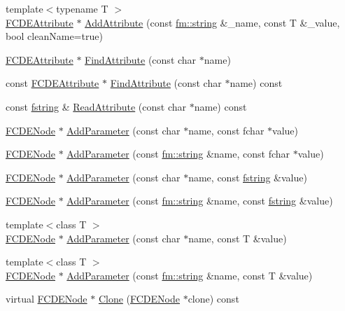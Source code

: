 \begin{DoxyCompactItemize}
\item 
{\footnotesize template$<$typename T $>$ }\\\hyperlink{classFCDEAttribute}{FCDEAttribute} $\ast$ \hyperlink{classFCDENode_acb91af32e7f1fac7f7de9819fee2fa1f}{AddAttribute} (const \hyperlink{classfm_1_1stringT}{fm::string} \&\_\-name, const T \&\_\-value, bool cleanName=true)
\item 
\hyperlink{classFCDEAttribute}{FCDEAttribute} $\ast$ \hyperlink{classFCDENode_a6e884f0a82646133db5cc931bca2b4f3}{FindAttribute} (const char $\ast$name)
\item 
const \hyperlink{classFCDEAttribute}{FCDEAttribute} $\ast$ \hyperlink{classFCDENode_aca538490764d00113b4b523ba1b8a124}{FindAttribute} (const char $\ast$name) const 
\item 
const \hyperlink{classfm_1_1stringT}{fstring} \& \hyperlink{classFCDENode_a4b5bd497353c7ef19a03f4a3736e55eb}{ReadAttribute} (const char $\ast$name) const 
\item 
\hyperlink{classFCDENode}{FCDENode} $\ast$ \hyperlink{classFCDENode_afccfb78c65118fbb51878e1e808cb9ce}{AddParameter} (const char $\ast$name, const fchar $\ast$value)
\item 
\hyperlink{classFCDENode}{FCDENode} $\ast$ \hyperlink{classFCDENode_a42767fbdf042fc7b0dc2a2e0d006c18c}{AddParameter} (const \hyperlink{classfm_1_1stringT}{fm::string} \&name, const fchar $\ast$value)
\item 
\hyperlink{classFCDENode}{FCDENode} $\ast$ \hyperlink{classFCDENode_ae11b6cf8debc87fa2579d75c05ece4f6}{AddParameter} (const char $\ast$name, const \hyperlink{classfm_1_1stringT}{fstring} \&value)
\item 
\hyperlink{classFCDENode}{FCDENode} $\ast$ \hyperlink{classFCDENode_a337904d3a7d22a2e0686abe39110c725}{AddParameter} (const \hyperlink{classfm_1_1stringT}{fm::string} \&name, const \hyperlink{classfm_1_1stringT}{fstring} \&value)
\item 
{\footnotesize template$<$class T $>$ }\\\hyperlink{classFCDENode}{FCDENode} $\ast$ \hyperlink{classFCDENode_a45cf5afb3523939cea3afaa90d83c703}{AddParameter} (const char $\ast$name, const T \&value)
\item 
{\footnotesize template$<$class T $>$ }\\\hyperlink{classFCDENode}{FCDENode} $\ast$ \hyperlink{classFCDENode_a10e0bc108f3c696c90ba3d2c14f5c096}{AddParameter} (const \hyperlink{classfm_1_1stringT}{fm::string} \&name, const T \&value)
\item 
virtual \hyperlink{classFCDENode}{FCDENode} $\ast$ \hyperlink{classFCDENode_ab098c534fe514f1a24567a9d785ca66d}{Clone} (\hyperlink{classFCDENode}{FCDENode} $\ast$clone) const 
\end{DoxyCompactItemize}
